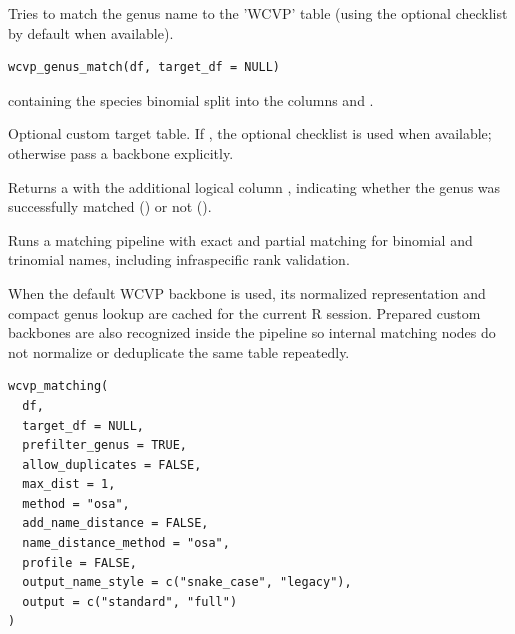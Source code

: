\documentclass[a4paper]{book}
\begin{document}
%
\begin{Description}
\strong{[Stable]}

Tries to match the genus name to the 'WCVP' table (using the optional  checklist by default when available).
\end{Description}
%
\begin{Usage}
\begin{verbatim}
wcvp_genus_match(df, target_df = NULL)
\end{verbatim}
\end{Usage}
%
\begin{Arguments}
\begin{ldescription}
\item[\code{df}]  containing the species binomial split into the columns  and .

\item[\code{target\_df}] Optional custom target table. If , the optional  checklist is used when available; otherwise pass a backbone explicitly.
\end{ldescription}
\end{Arguments}
%
\begin{Value}
Returns a  with the additional logical column , indicating whether the genus was successfully matched () or not ().
\end{Value}
%
\begin{Description}
\strong{[Stable]}

Runs a matching pipeline with exact and partial matching for binomial and
trinomial names, including infraspecific rank validation.

When the default WCVP backbone is used, its normalized representation and
compact genus lookup are cached for the current R session. Prepared custom
backbones are also recognized inside the pipeline so internal matching nodes
do not normalize or deduplicate the same table repeatedly.
\end{Description}
%
\begin{Usage}
\begin{verbatim}
wcvp_matching(
  df,
  target_df = NULL,
  prefilter_genus = TRUE,
  allow_duplicates = FALSE,
  max_dist = 1,
  method = "osa",
  add_name_distance = FALSE,
  name_distance_method = "osa",
  profile = FALSE,
  output_name_style = c("snake_case", "legacy"),
  output = c("standard", "full")
)
\end{verbatim}
\end{Usage}
\end{document}

